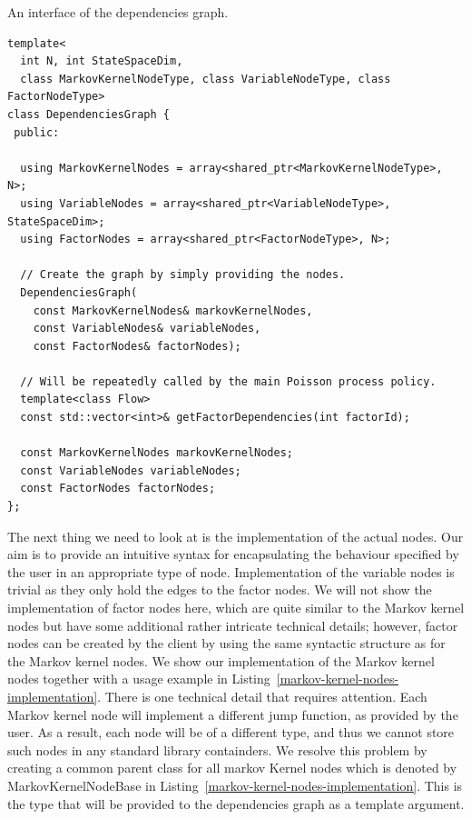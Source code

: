 \documentclass[report.tex]{subfiles}
\begin{document}
\begin{lstfloat}
\caption{An interface of the dependencies graph.}
\label{listing-dependencies-graph}
\begin{lstlisting}
template<
  int N, int StateSpaceDim,
  class MarkovKernelNodeType, class VariableNodeType, class FactorNodeType>
class DependenciesGraph {
 public:

  using MarkovKernelNodes = array<shared_ptr<MarkovKernelNodeType>, N>;
  using VariableNodes = array<shared_ptr<VariableNodeType>, StateSpaceDim>;
  using FactorNodes = array<shared_ptr<FactorNodeType>, N>;

  // Create the graph by simply providing the nodes.
  DependenciesGraph(
    const MarkovKernelNodes& markovKernelNodes,
    const VariableNodes& variableNodes,
    const FactorNodes& factorNodes);

  // Will be repeatedly called by the main Poisson process policy.
  template<class Flow>
  const std::vector<int>& getFactorDependencies(int factorId);

  const MarkovKernelNodes markovKernelNodes;
  const VariableNodes variableNodes;
  const FactorNodes factorNodes;
};
\end{lstlisting}
\end{lstfloat}

The next thing we need to look at is the implementation of the actual nodes.
Our aim is to provide an intuitive syntax for encapsulating the behaviour specified by the user
in an appropriate type of node.
Implementation of the variable nodes is trivial as they only hold the
edges to the factor nodes.
We will not show the implementation of factor nodes here, which are quite
similar to the Markov kernel nodes but have some additional rather intricate technical details;
however, factor nodes can be created by the client by using the same syntactic structure as
for the Markov kernel nodes.
We show our implementation of the Markov kernel nodes together with a usage example
in Listing~\ref{markov-kernel-nodes-implementation}.
There is one technical detail that requires attention.
Each Markov kernel node will implement a different jump function, as provided by
the user. As a result, each node will be of a different type, and thus we cannot
store such nodes in any standard library containders.
We resolve this problem by creating a common parent class for all markov
Kernel nodes which is denoted by MarkovKernelNodeBase in Listing~\ref{markov-kernel-nodes-implementation}.
This is the type that will be provided to the dependencies graph as a template argument.
\end{document}
